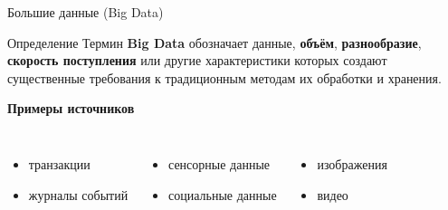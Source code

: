 \documentclass[aspectratio=169]{beamer}
\begin{document}
\begin{frame}{Большие данные (Big Data)}

\begin{block}{Определение}
Термин \textbf{Big Data} обозначает данные, 
\textbf{объём}, \textbf{разнообразие}, \textbf{скорость поступления}
или другие характеристики которых создают существенные
требования к традиционным методам их обработки и хранения.
\end{block}

\vspace{0.6cm}

\begin{center}
\large\textbf{Примеры источников}
\end{center}

\vspace{0.2cm}

\begin{columns}[T]

\begin{itemize}
    \item транзакции
    \item журналы событий
\end{itemize}

\begin{itemize}
    \item сенсорные данные
    \item социальные данные
\end{itemize}

\begin{itemize}
    \item изображения
    \item видео
\end{itemize}

\end{columns}

\end{frame}


\end{document}
